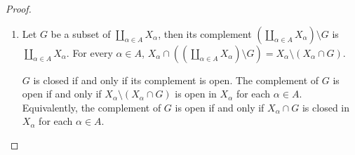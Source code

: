 \begin{proof}
	\begin{enumerate}[label={(\alph*)}]
		\item Let $G$ be a subset of $\coprod_{\alpha\in A}X_{\alpha}$, then its complement $\left(\coprod_{\alpha\in A}X_{\alpha}\right)\setminus G$ is $\coprod_{\alpha\in A}X_{\alpha}$. For every $\alpha\in A$, $X_{\alpha}\cap \left(\left(\coprod_{\alpha\in A}X_{\alpha}\right)\setminus G\right) = X_{\alpha}\setminus (X_{\alpha}\cap G)$.

		      $G$ is closed if and only if its complement is open. The complement of $G$ is open if and only if $X_{\alpha}\setminus (X_{\alpha}\cap G)$ is open in $X_{\alpha}$ for each $\alpha\in A$. Equivalently, the complement of $G$ is open if and only if $X_{\alpha}\cap G$ is closed in $X_{\alpha}$ for each $\alpha\in A$.


\end{enumerate}
\end{proof}
